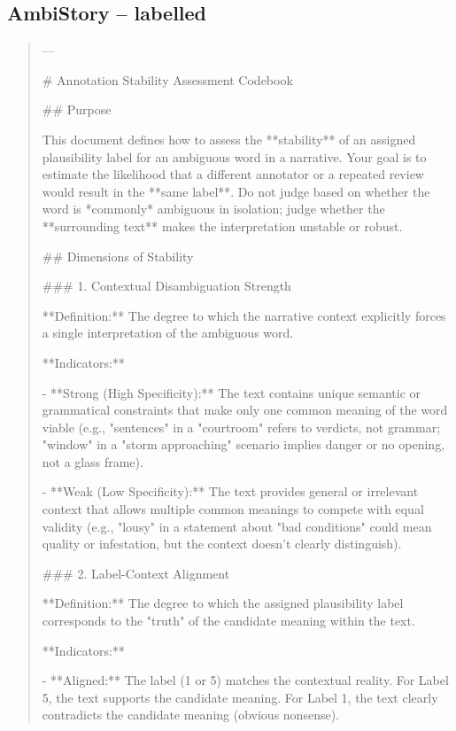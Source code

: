 \subsection*{AmbiStory -- labelled}
\begin{quote}\small
---



# Annotation Stability Assessment Codebook



## Purpose

This document defines how to assess the **stability** of an assigned plausibility label for an ambiguous word in a narrative. Your goal is to estimate the likelihood that a different annotator or a repeated review would result in the **same label**. Do not judge based on whether the word is *commonly* ambiguous in isolation; judge whether the **surrounding text** makes the interpretation unstable or robust.



## Dimensions of Stability



### 1. Contextual Disambiguation Strength

**Definition:** The degree to which the narrative context explicitly forces a single interpretation of the ambiguous word.

**Indicators:**

- **Strong (High Specificity):** The text contains unique semantic or grammatical constraints that make only one common meaning of the word viable (e.g., "sentences" in a "courtroom" refers to verdicts, not grammar; "window" in a "storm approaching" scenario implies danger or no opening, not a glass frame).

- **Weak (Low Specificity):** The text provides general or irrelevant context that allows multiple common meanings to compete with equal validity (e.g., "lousy" in a statement about "bad conditions" could mean quality or infestation, but the context doesn't clearly distinguish).



### 2. Label-Context Alignment

**Definition:** The degree to which the assigned plausibility label corresponds to the "truth" of the candidate meaning within the text.

**Indicators:**

- **Aligned:** The label (1 or 5) matches the contextual reality. For Label 5, the text supports the candidate meaning. For Label 1, the text clearly contradicts the candidate meaning (obvious nonsense).


\end{quote}
